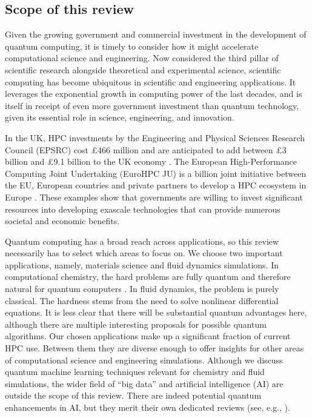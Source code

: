 \documentclass[10pt]{iopart}
\begin{document}
\subsection{Scope of this review}

Given the growing government and commercial investment in the development of quantum computing, it is timely to consider how it might accelerate computational science and engineering. Now considered the third pillar of scientific research alongside theoretical and experimental science, scientific computing has become ubiquitous in scientific and engineering applications. It leverages the exponential growth in computing power of the last decades, and is itself in receipt of even more government investment than quantum technology, given its essential role in science, engineering, and innovation. 

In the UK, HPC investments by the Engineering and Physical Sciences Research Council (EPSRC) cost \pounds466 million and are anticipated to add between \pounds3 billion and \pounds9.1 billion to the UK economy \cite{DSIT2022}. The European High-Performance Computing Joint Undertaking (EuroHPC JU) is a  billion joint initiative between the EU, European countries and private partners to develop a HPC ecosystem in Europe \cite{EuroHPC}. These examples show that governments are willing to invest significant resources into developing exascale technologies that can provide numerous societal and economic benefits.

Quantum computing has a broad reach across applications, so this review necessarily has to select which areas to focus on. We choose two important applications, namely, materials science and fluid dynamics simulations. In computational chemistry, the hard problems are fully quantum and therefore natural for quantum computers \cite{Feynman1982}. In fluid dynamics, the problem is purely classical. The hardness stems from the need to solve nonlinear differential equations. It is less clear that there will be substantial quantum advantages here, although there are multiple interesting proposals for possible quantum algorithms. Our chosen applications make up a significant fraction of current HPC use. Between them they are diverse enough to offer insights for other areas of computational science and engineering simulations.  Although we discuss quantum machine learning techniques relevant for chemistry and fluid simulations, the wider field of ``big data'' and artificial intelligence (AI) are outside the scope of this review. There are indeed potential quantum enhancements in AI, but they merit their own dedicated reviews (see, e.g., \citeauthor{Dunjko2018} \cite{Dunjko2018}).
\end{document}
